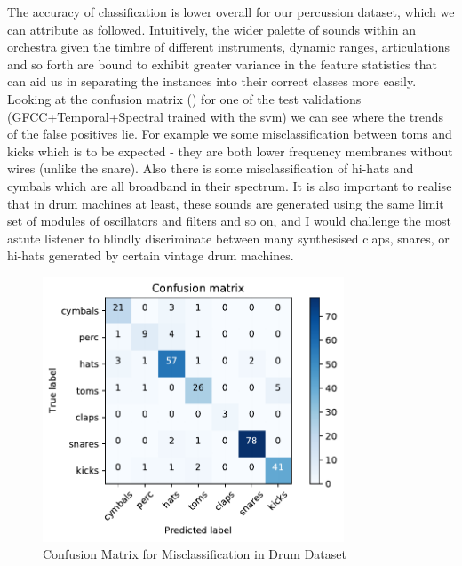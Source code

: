 {{{{{{{The accuracy of classification is lower overall for our percussion dataset, which we can attribute as followed. Intuitively, the wider palette of sounds within an orchestra given the timbre of different instruments, dynamic ranges, articulations and so forth are bound to exhibit greater variance in the feature statistics that can aid us in separating the instances into their correct classes more easily. Looking at the confusion matrix () for one of the test validations (GFCC+Temporal+Spectral trained with the \acrshort{svm}) we can see where the trends of the false positives lie. For example we some misclassification between toms and kicks which is to be expected - they are both lower frequency membranes without wires (unlike the snare). Also there is some misclassification of hi-hats and cymbals which are all broadband in their spectrum. It is also important to realise that in drum machines at least, these sounds are generated using the same limit set of modules of oscillators and filters and so on, and I would challenge the most astute listener to blindly discriminate between many synthesised claps, snares, or hi-hats generated by  certain vintage drum machines.

\begin{figure}
	\begin{center}
		\includegraphics[width=0.8\textwidth]{ch05_pyconcat/figures/drum_confusion.pdf}
	\end{center}
	\caption[Confusion Matrix for Misclassification in Drum Dataset]{Confusion Matrix for Misclassification in Drum Dataset}
	\label{fig:drum_confusion}
\end{figure}

}}}}}}}
